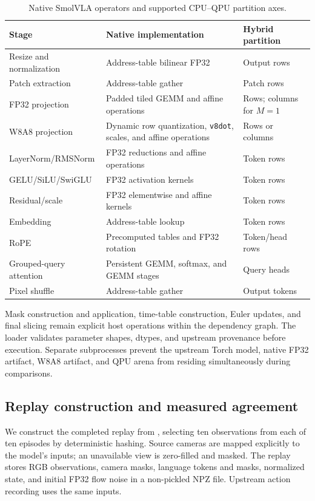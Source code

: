 \documentclass[sigplan,screen,review]{acmart}
\begin{document}
\begin{table}[t]
\centering
\caption{Native SmolVLA operators and supported CPU--QPU partition axes.}
\label{tab:smolvla-stages}
\small
\begin{tabularx}{\textwidth}{@{}l X l@{}}
\toprule
Stage & Native implementation & Hybrid partition \\
\midrule
Resize and normalization & Address-table bilinear FP32 & Output rows \\
Patch extraction & Address-table gather & Patch rows \\
FP32 projection & Padded tiled GEMM and affine operations & Rows; columns for $M=1$ \\
W8A8 projection & Dynamic row quantization, \texttt{v8dot}, scales, and affine operations & Rows or columns \\
LayerNorm/RMSNorm & FP32 reductions and affine operations & Token rows \\
GELU/SiLU/SwiGLU & FP32 activation kernels & Token rows \\
Residual/scale & FP32 elementwise and affine kernels & Token rows \\
Embedding & Address-table lookup & Token rows \\
RoPE & Precomputed tables and FP32 rotation & Token/head rows \\
Grouped-query attention & Persistent GEMM, softmax, and GEMM stages & Query heads \\
Pixel shuffle & Address-table gather & Output tokens \\
\bottomrule
\end{tabularx}
\end{table}

Mask construction and application, time-table construction, Euler updates, and final slicing remain explicit host operations within the dependency graph. The loader validates parameter shapes, dtypes, and upstream provenance before execution. Separate subprocesses prevent the upstream Torch model, native FP32 artifact, W8A8 artifact, and QPU arena from residing simultaneously during comparisons.

\subsection{Replay construction and measured agreement}

We construct the completed replay from , selecting ten observations from each of ten episodes by deterministic hashing. Source cameras are mapped explicitly to the model's inputs; an unavailable view is zero-filled and masked. The replay stores RGB observations, camera masks, language tokens and masks, normalized state, and initial FP32 flow noise in a non-pickled NPZ file. Upstream action recording uses the same inputs.
\end{document}
